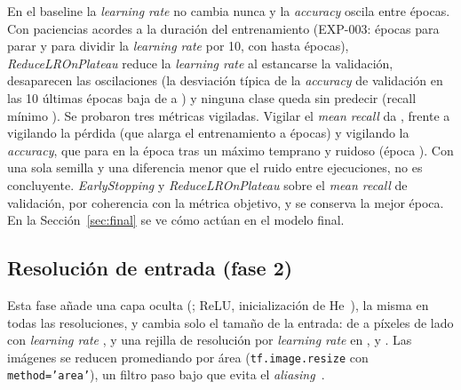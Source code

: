 {En el baseline la \emph{learning rate} no cambia nunca y la \emph{accuracy} oscila entre épocas.}
{Con paciencias acordes a la duración del entrenamiento (EXP-003:  épocas para parar y
 para dividir la \emph{learning rate} por 10, con hasta  épocas),
\emph{ReduceLROnPlateau} reduce la \emph{learning rate} al estancarse la validación, desaparecen las oscilaciones (la
desviación típica de la \emph{accuracy} de validación en las 10 últimas épocas baja de  a
) y ninguna clase queda sin predecir (recall mínimo ). Se probaron
tres métricas vigiladas. Vigilar el \emph{mean recall} da , frente a
 vigilando la pérdida (que alarga el entrenamiento a 
épocas) y  vigilando la \emph{accuracy}, que para en la época
 tras un máximo temprano y ruidoso (época ). Con una sola
semilla y una diferencia menor que el ruido entre ejecuciones, no es concluyente.}
{\emph{EarlyStopping} y \emph{ReduceLROnPlateau} sobre el \emph{mean recall} de validación, por coherencia con la
métrica objetivo, y se conserva la mejor época. En la Sección~\ref{sec:final} se ve cómo actúan en el modelo final.}

\begin{figure}[!htbp]
  \centering
  \caption{}
  \label{fig:normalisation}
\end{figure}

\subsection{Resolución de entrada (fase 2)}
Esta fase añade una capa oculta (; ReLU, inicialización de He~\cite{he}), la misma en
todas las resoluciones, y cambia solo el tamaño de la entrada: de  a  píxeles de lado con
\emph{learning rate} , y una rejilla de resolución por \emph{learning rate} en ,
 y . Las imágenes se reducen promediando por área (\texttt{tf.image.resize} con
\texttt{method='area'}), un filtro paso bajo que evita el \emph{aliasing}~\cite{gonzalez}.

